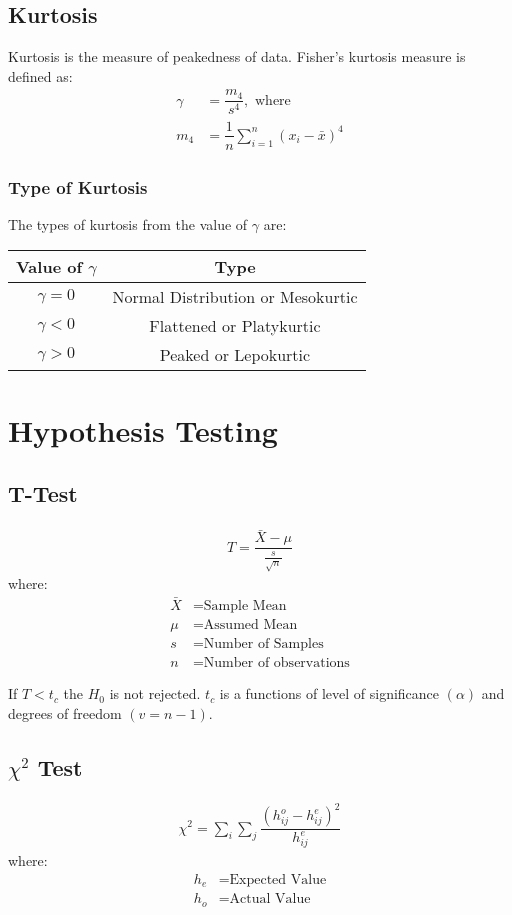 \documentclass[openany, oneside]{book}
\begin{document}
\section{Kurtosis}
Kurtosis is the measure of peakedness of data. Fisher's kurtosis measure is defined as:
\begin{align}
	\gamma &= \dfrac{m_4}{s^4}, \text{ where}\\
	m_4 &= \dfrac{1}{n}\sum_{i=1}^{n} \left( x_i - \bar{x} \right)^4
\end{align}

\subsection{Type of Kurtosis}
The types of kurtosis from the value of $\gamma$ are:
\begin{table}[h!]
	\centering
	\begin{tabular}{c|c}
		Value of $\gamma$ & Type\\
		\hline
		$\gamma = 0$ & Normal Distribution or Mesokurtic\\
		$\gamma < 0$ & Flattened or Platykurtic\\
		$\gamma > 0$ & Peaked or Lepokurtic
	\end{tabular}
\end{table}

\chapter{Hypothesis Testing}
\section{T-Test}
\begin{align}
	T = \dfrac{\bar{X}-\mu}{\frac{s}{\sqrt{n}}}
\end{align}
where:
\begin{align*}
	\bar{X} &= \text{Sample Mean}\\
	\mu &= \text{Assumed Mean}\\
	s &= \text{Number of Samples}\\
	n &= \text{Number of observations}
\end{align*}

If $T < t_c$ the $H_0$ is not rejected. $t_c$ is a functions of level of significance $(\alpha)$ and degrees of freedom $(v = n -1)$.

\section{$\chi^2$ Test}
\begin{align}
	\chi^2 = \sum_i \sum_j \dfrac{(h_{ij}^o-h_{ij}^e)^2}{h_{ij}^e}
\end{align}
where:
\begin{align*}
	h_e &= \text{Expected Value}\\
	h_o &= \text{Actual Value}
\end{align*}
\end{document}
